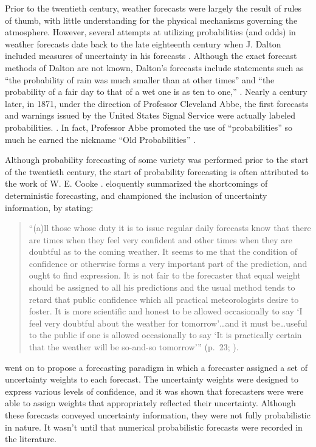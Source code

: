 Prior to the twentieth century, weather forecasts were largely the result of rules of thumb, with little understanding for the physical mechanisms governing the atmosphere.
However, several attempts at utilizing probabilities (and odds) in weather forecasts date back to the late eighteenth century when J. Dalton included measures of uncertainty in his forecasts \citep{Dalton1793, Murphy1998}.
Although the exact forecast methods of Dalton are not known, Dalton's forecasts include statements such as ``the probability of rain was much smaller than at other times'' and ``the probability of a fair day to that of a wet one is as ten to one,'' \citep{Murphy1998}.
Nearly a century later, in 1871, under the direction of Professor Cleveland Abbe, the first forecasts and warnings issued by the United States Signal Service were actually labeled probabilities. \citep{Whitnah1961, Murphy1998}.
In fact, Professor Abbe promoted the use of ``probabilities'' so much he earned the nickname ``Old Probabilities'' \citep{Scott1873, Murphy1998}.


Although probability forecasting of some variety was performed prior to the start of the twentieth century, the start of probability forecasting is often attributed to the work of W. E. Cooke \cite{Murphy1998}.
\cite{Cooke1906a} eloquently summarized the shortcomings of deterministic forecasting, and championed the inclusion of uncertainty information, by stating:
\begin{quote}
    ``(a)ll those whose duty it is to issue regular daily forecasts know that there are times when they feel very confident and other times when they are doubtful as to the coming weather. It seems to me that the condition of confidence or otherwise forms a very important part of the prediction, and ought to find expression. It is not fair to the forecaster that equal weight should be assigned to all his predictions and the usual method tends to retard that public confidence which all practical meteorologists desire to foster. It is more scientific and honest to be allowed occasionally to say `I feel very doubtful about the weather for tomorrow'\dots and it must be\dots useful to the public if one is allowed occasionally to say `It is practically certain that the weather will be so-and-so tomorrow''' (\mbox{p. 23}; \citealp{Murphy1998}).
\end{quote}


\noindent\cite{Cooke1906a} went on to propose a forecasting paradigm in which a forecaster assigned a set of uncertainty weights to each forecast.
The uncertainty weights were designed to express various levels of confidence, and it was shown that forecasters were were able to assign weights that appropriately reflected their uncertainty.
Although these forecasts conveyed uncertainty information, they were not fully probabilistic in nature.
It wasn't until \cite{Hallenbeck1920} that numerical probabilistic forecasts were recorded in the literature.


